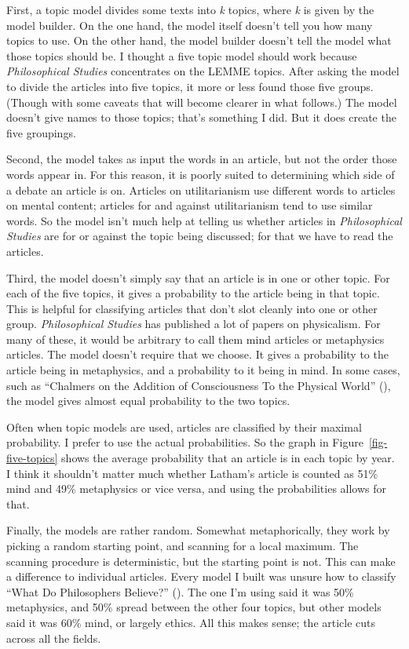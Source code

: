 \documentclass[
  10pt,
  letterpaper,
  DIV=11,
  numbers=noendperiod,
  twoside]{scrartcl}
\begin{document}
First, a topic model divides some texts into \emph{k} topics, where
\emph{k} is given by the model builder. On the one hand, the model
itself doesn't tell you how many topics to use. On the other hand, the
model builder doesn't tell the model what those topics should be. I
thought a five topic model should work because \emph{Philosophical
Studies} concentrates on the LEMME topics. After asking the model to
divide the articles into five topics, it more or less found those five
groups. (Though with some caveats that will become clearer in what
follows.) The model doesn't give names to those topics; that's something
I did. But it does create the five groupings.

Second, the model takes as input the words in an article, but not the
order those words appear in. For this reason, it is poorly suited to
determining which side of a debate an article is on. Articles on
utilitarianism use different words to articles on mental content;
articles for and against utilitarianism tend to use similar words. So
the model isn't much help at telling us whether articles in
\emph{Philosophical Studies} are for or against the topic being
discussed; for that we have to read the articles.

Third, the model doesn't simply say that an article is in one or other
topic. For each of the five topics, it gives a probability to the
article being in that topic. This is helpful for classifying articles
that don't slot cleanly into one or other group. \emph{Philosophical
Studies} has published a lot of papers on physicalism. For many of
these, it would be arbitrary to call them mind articles or metaphysics
articles. The model doesn't require that we choose. It gives a
probability to the article being in metaphysics, and a probability to it
being in mind. In some cases, such as ``Chalmers on the Addition of
Consciousness To the Physical World''
(), the model gives almost
equal probability to the two topics.

Often when topic models are used, articles are classified by their
maximal probability. I prefer to use the actual probabilities. So the
graph in Figure~\ref{fig-five-topics} shows the average probability that
an article is in each topic by year. I think it shouldn't matter much
whether Latham's article is counted as 51\% mind and 49\% metaphysics or
vice versa, and using the probabilities allows for that.

Finally, the models are rather random. Somewhat metaphorically, they
work by picking a random starting point, and scanning for a local
maximum. The scanning procedure is deterministic, but the starting point
is not. This can make a difference to individual articles. Every model I
built was unsure how to classify ``What Do Philosophers Believe?''
(). The one
I'm using said it was 50\% metaphysics, and 50\% spread between the
other four topics, but other models said it was 60\% mind, or largely
ethics. All this makes sense; the article cuts across all the fields.
\end{document}

